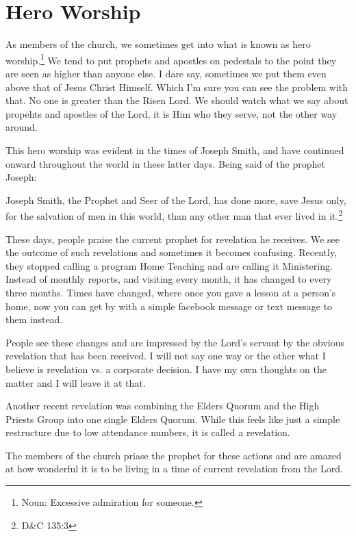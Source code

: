 \chapter{Hero Worship}

As members of the church, we sometimes get into what is known as hero
worship.\footnote{Noun: Excessive admiration for someone.} We tend to put prophets
and apostles on pedestals to the point they are seen as higher than anyone else. I
dare say, sometimes we put them even above that of Jesus Christ Himself. Which I'm
sure you can see the problem with that. No one is greater than the Risen Lord. We
should watch what we say about propehts and apostles of the Lord, it is Him who they
serve, not the other way around.

This hero worship was evident in the times of Joseph Smith, and have continued onward
throughout the world in these latter days. Being said of the prophet Joseph:

\begin{displayquote}
Joseph Smith, the Prophet and Seer of the Lord, has done more, save Jesus only, 
for the salvation of men in this world, than any other man that ever lived in
it.\footnote{D\&C 135:3}
\end{displayquote}

These days, people praise the current prophet for revelation he receives. We see the
outcome of such revelations and sometimes it becomes confusing. Recently, they
stopped calling a program Home Teaching and are calling it Ministering. Instead of
monthly reports, and visiting every month, it has changed to every three months.
Times have changed, where once you gave a lesson at a person's home, now you can get
by with a simple facebook message or text message to them instead.

People see these changes and are impressed by the Lord's servant by the obvious
revelation that has been received. I will not say one way or the other what I believe
is revelation vs. a corporate decision. I have my own thoughts on the matter and I
will leave it at that.

Another recent revelation was combining the Elders Quorum and the High Priests Group
into one single Elders Quorum. While this feels like just a simple restructure due to
low attendance numbers, it is called a revelation.

The members of the church priase the prophet for these actions and are amazed at how
wonderful it is to be living in a time of current revelation from the Lord.


